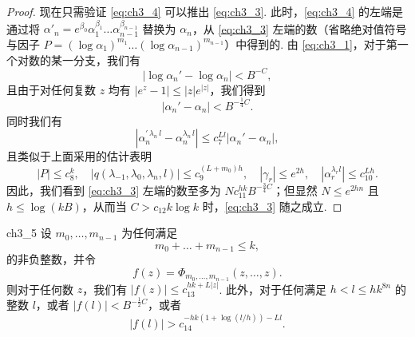 \begin{proof}
现在只需验证 \eqref{eq:ch3_4} 可以推出 \eqref{eq:ch3_3}. 此时，\eqref{eq:ch3_4} 的左端是通过将 $\alpha'_n = e^{\beta_0} \alpha_1^{\beta_1} \dots \alpha_{n-1}^{\beta_{n-1}}$ 替换为 $\alpha_n$，从 \eqref{eq:ch3_3} 左端的数（省略绝对值符号与因子 $P = (\log \alpha_1)^{m_1} \dots (\log \alpha_{n-1})^{m_{n-1}}$）中得到的. 由 \eqref{eq:ch3_1}，对于第一个对数的某一分支，我们有
\[
|\log \alpha_n' - \log \alpha_n| < B^{-C},
\]
且由于对任何复数 $z$ 均有 $|e^z-1| \le |z| e^{|z|}$，我们得到
\begin{equation} \label{eq:ch3_5}\tag{5}
|\alpha_n' - \alpha_n| < B^{-\frac{1}{4}C}.
\end{equation}
同时我们有
\[
\left|\alpha_n^{\prime\,\lambda_n\,l} - \alpha_n^{\lambda_n\,l}\right| \le c_7^{Ll} |\alpha_n' - \alpha_n|,
\]
且类似于上面采用的估计表明
\[
|P| \le c_8^k, \quad |q(\lambda_{-1}, \lambda_0, \lambda_n, l)| \le c_9^{(L+m_0)h}, \quad |\gamma_r| \le e^{2h}, \quad |\alpha_r^{\lambda_r l}| \le c_{10}^{Lh}.
\]
    因此，我们看到 \eqref{eq:ch3_3} 左端的数至多为 $N c_{11}^{hk} B^{-\frac{3}{4}C}$；但显然 $N \le e^{2hn}$ 且 $h \le \log(kB)$，从而当 $C > c_{12}k \log k$ 时，\eqref{eq:ch3_3} 随之成立.
\end{proof}

\begin{mylemma}{}{ch3_5}
设 $m_0, \dots, m_{n-1}$ 为任何满足
\[
m_0 + \dots + m_{n-1} \le k,
\]
的非负整数，并令
\[
f(z) = \Phi_{m_0, \dots, m_{n-1}}(z, \dots, z).
\]
则对于任何数 $z$，我们有 $|f(z)| \le c_{13}^{hk+L|z|}$. 此外，对于任何满足 $h < l \le hk^{8n}$ 的整数 $l$，或者 $|f(l)| < B^{-\frac{1}{2}C}$，或者
\begin{equation} \label{eq:ch3_6}\tag{6}
|f(l)| > c_{14}^{-hk(1+\log(l/h))-Ll}.
\end{equation}
\end{mylemma}

